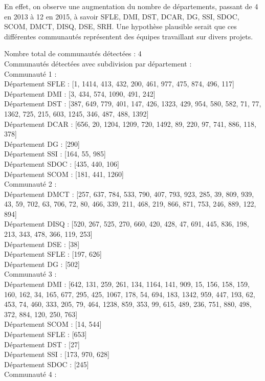 \documentclass{article}
\begin{document}
En effet, on observe une augmentation du nombre de départements, passant de 4 en 2013 à 12 en 2015, à savoir SFLE, DMI, DST, DCAR, DG, SSI, SDOC, SCOM, DMCT, DISQ, DSE, SRH. Une hypothèse plausible serait que ces différentes communautés représentent des équipes travaillant sur divers projets.

Nombre total de communautés détectées : 4 \\

Communautés détectées avec subdivision par département : \\

Communauté 1 : \\

Département SFLE : [1, 1414, 413, 432, 200, 461, 977, 475, 874, 496, 117] \\
Département DMI : [3, 434, 574, 1090, 491, 242] \\
Département DST : [387, 649, 779, 401, 147, 426, 1323, 429, 954, 580, 582, 71, 77, 1362, 725, 215, 603, 1245, 346, 487, 488, 1392] \\
Département DCAR : [656, 20, 1204, 1209, 720, 1492, 89, 220, 97, 741, 886, 118, 378] \\
Département DG : [290] \\
Département SSI : [164, 55, 985] \\
Département SDOC : [435, 440, 106] \\
Département SCOM : [181, 441, 1260] \\
Communauté 2 : \\

Département DMCT : [257, 637, 784, 533, 790, 407, 793, 923, 285, 39, 809, 939, 43, 59, 702, 63, 706, 72, 80, 466, 339, 211, 468, 219, 866, 871, 753, 246, 889, 122, 894] \\
Département DISQ : [520, 267, 525, 270, 660, 420, 428, 47, 691, 445, 836, 198, 213, 343, 478, 366, 119, 253] \\
Département DSE : [38] \\
Département SFLE : [197, 626] \\
Département DG : [502] \\
Communauté 3 : \\

Département DMI : [642, 131, 259, 261, 134, 1164, 141, 909, 15, 156, 158, 159, 160, 162, 34, 165, 677, 295, 425, 1067, 178, 54, 694, 183, 1342, 959, 447, 193, 62, 453, 74, 460, 333, 205, 79, 464, 1238, 859, 353, 99, 615, 489, 236, 751, 880, 498, 372, 884, 120, 250, 763] \\
Département SCOM : [14, 544] \\
Département SFLE : [653] \\
Département DST : [27] \\
Département SSI : [173, 970, 628] \\
Département SDOC : [245] \\
Communauté 4 :
\end{document}

